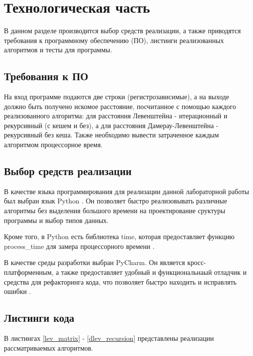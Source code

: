 \chapter{Технологическая часть}

В данном разделе производится выбор средств реализации, а также приводятся требования к программному обеспечению (ПО), листинги реализованных алгоритмов и тесты для программы.

\section{Требования к ПО}

На вход программе подаются две строки (регистрозависимые), а на выходе должно быть получено искомое расстояние, посчитанное с помощью каждого реализованного алгоритма: для расстояния Левенштейна - итерационный и рекурсивный (с кешем и без), а для расстояния Дамерау-Левенштейна - рекурсивный без кеша. Также необходимо вывести затраченное каждым алгоритмом процессорное время.

\section{Выбор средств реализации}

В качестве языка программирования для реализации данной лабораторной работы был выбран язык Python  \cite{PythonBook}. Он позволяет быстро реализовывать различные алгоритмы без выделения большого времени на проектирование сруктуры программы и выбор типов данных. 

Кроме того, в Python есть библиотека time, которая предоставляет функцию process\_time для замера процессорного времени \cite{process_time_text}.

В качестве среды разработки выбран PyCharm. Он является кросс-платформенным, а также предоставляет удобный и функциональнаый отладчик и средства для рефакторинга кода, что позволяет быстро находить и исправлять ошибки \cite{pycharm}.

\section{Листинги кода}

В листингах \ref{lev_matrix} - \ref{dlev_recursion} представлены реализации рассматриваемых алгоритмов.

